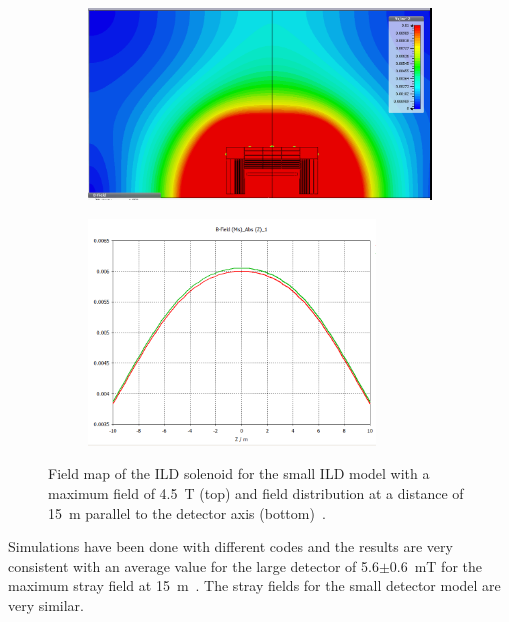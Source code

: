 \begin{figure}[h!]
\begin{center}
\begin{subfigure}{0.9\hsize} \includegraphics[width=\textwidth]{Integration/fig/strayfield_small_4_5.png}
\caption{ \label{ild:fig:magnet_small_stray_map}}
 \end{subfigure}
\hspace{0.03\textwidth}
\begin{subfigure}{0.9\hsize} \includegraphics[width=\textwidth, height =6cm]{Integration/fig/strayfield_small_4_5_plot.png}
\caption{  \label{ild:fig:magnet_small_stray_field}}
 \end{subfigure}
\end{center}
\caption{Field map of the ILD solenoid for the small ILD model with a maximum field of 4.5~T (top) and field distribution at a distance of 15~m parallel to the detector axis (bottom)~\cite{ild:bib:Magnet_Simulations}.}
\label{ILD:fig:magnet_small_stray}
\end{figure}

Simulations have been done with different codes and the results are very consistent with an average value for the large detector of 5.6$\pm$0.6~mT for the maximum stray field at 15~m~\cite{ild:bib:Magnet_Simulations}. The stray fields for the small detector model are very similar. 

